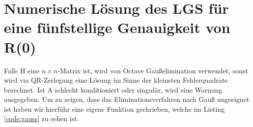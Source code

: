 \chapter{Numerische Lösung des LGS für eine fünfstellige Genauigkeit von R(0)}
Falls H eine \(n \times n\)-Matrix ist, wird von Octave Gaußelimination verwendet, sonst wird via
QR-Zerlegung eine Lösung im Sinne der kleinsten Fehlerquadrate berechnet. Ist A schlecht
konditioniert oder singulär, wird eine Warnung ausgegeben. Um zu zeigen, dass das
Eliminationsverfahren nach Gauß ungeeignet ist haben wir hierführ eine eigene Funktion gechrieben,
welche im Listing \ref{code:gauss} zu sehen ist.

\lstset{label=code:gauss, caption=Gauß-Eliminationsverfahren als Matlab-/Octavescript}
